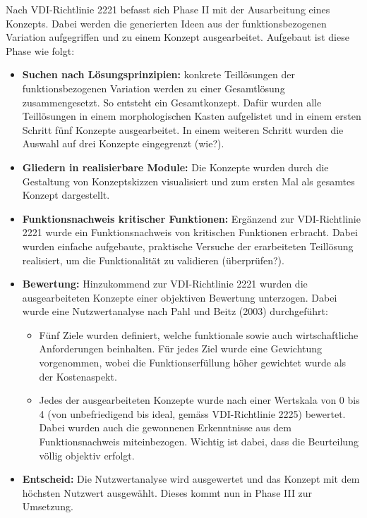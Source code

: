 Nach  VDI-Richtlinie 2221 befasst sich Phase II mit der Ausarbeitung eines Konzepts. Dabei werden die generierten Ideen aus der funktionsbezogenen Variation aufgegriffen und zu einem Konzept ausgearbeitet. Aufgebaut ist diese Phase wie folgt:

\begin{itemize}
	\item \textbf{Suchen nach Lösungsprinzipien:} konkrete Teillösungen der funktionsbezogenen Variation werden zu einer Gesamtlösung zusammengesetzt. So entsteht ein Gesamtkonzept. Dafür wurden alle Teillösungen in einem morphologischen Kasten aufgelistet und in einem ersten Schritt fünf Konzepte ausgearbeitet. In einem weiteren Schritt wurden die Auswahl auf drei Konzepte eingegrenzt (wie?).
	
	\item \textbf{Gliedern in realisierbare Module:} Die Konzepte wurden durch die Gestaltung von Konzeptskizzen visualisiert und zum ersten Mal als gesamtes Konzept dargestellt. 
	
	\item \textbf{Funktionsnachweis kritischer Funktionen:} Ergänzend zur VDI-Richtlinie 2221 wurde ein Funktionsnachweis von kritischen Funktionen erbracht. Dabei wurden einfache aufgebaute, praktische Versuche der erarbeiteten Teillösung realisiert, um die Funktionalität zu validieren (überprüfen?).
	
	\item \textbf{Bewertung:} Hinzukommend zur VDI-Richtlinie 2221 wurden die ausgearbeiteten Konzepte einer objektiven Bewertung unterzogen. Dabei wurde eine Nutzwertanalyse nach Pahl und Beitz (2003) durchgeführt:
	\begin{itemize}
		\item Fünf Ziele wurden definiert, welche funktionale sowie auch wirtschaftliche Anforderungen beinhalten. Für jedes Ziel wurde eine Gewichtung vorgenommen, wobei die Funktionserfüllung höher gewichtet wurde als der Kostenaspekt.
		
		\item Jedes der ausgearbeiteten Konzepte wurde nach einer Wertskala von 0 bis 4 (von unbefriedigend bis ideal, gemäss VDI-Richtlinie 2225) bewertet. Dabei wurden auch die gewonnenen Erkenntnisse aus dem Funktionsnachweis miteinbezogen. Wichtig ist dabei, dass die Beurteilung völlig objektiv erfolgt.
	\end{itemize}	
	
	\item \textbf{Entscheid:} Die Nutzwertanalyse wird ausgewertet und das Konzept mit dem höchsten Nutzwert ausgewählt. Dieses kommt nun in Phase III zur Umsetzung. 
\end{itemize}

